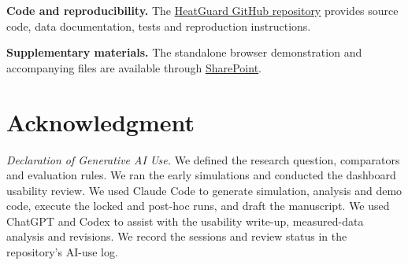 \documentclass[conference,a4paper]{IEEEtran}
\begin{document}
\noindent\textbf{Code and reproducibility.} The \href{https://github.com/rayen1214-hub/Heatguard}{\underline{HeatGuard GitHub repository}} provides source code, data documentation, tests and reproduction instructions.

\noindent\textbf{Supplementary materials.} The standalone browser demonstration and accompanying files are available through \href{https://uowmailedu-my.sharepoint.com/:f:/g/personal/fp418_uowmail_edu_au/IgAwG3WqqWcARrZaE-4lCy9QASuq_GTxz7iU6o4pjrf9EiU?e=v9Q385}{\underline{SharePoint}}.

\section*{Acknowledgment}
\textit{Declaration of Generative AI Use.} We defined the research question, comparators and evaluation rules. We ran the early simulations and conducted the dashboard usability review. We used Claude Code to generate simulation, analysis and demo code, execute the locked and post-hoc runs, and draft the manuscript. We used ChatGPT and Codex to assist with the usability write-up, measured-data analysis and revisions. We record the sessions and review status in the repository's AI-use log.
\end{document}
